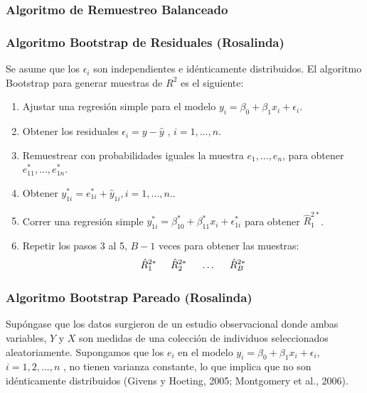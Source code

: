 \subsubsection{Algoritmo de Remuestreo Balanceado}



\subsubsection{Algoritmo Bootstrap de Residuales (Rosalinda)}

Se asume que los $ \epsilon_{i} $ son independientes e idénticamente distribuidos. El algoritmo Bootstrap para generar muestras de $ R^{2} $ es el siguiente:

\begin{enumerate}
		\item Ajustar una regresión simple para el modelo $ y_{i} = \beta_{0} +\beta_{1}x_{i} + \epsilon_{i} $.
		\item Obtener los residuales $ \epsilon_{i} = y - \hat{y}   $
		, $i = 1,..., n $.
		\item  Remuestrear con probabilidades iguales la muestra $ e_{1},...,e_{n} $, para obtener $e^{*}_{11},...,e^{*}_{1n}$.
		\item Obtener $ y^{*}_{1i} = e^{*}_{1i} + \hat{y}_{1i}, i = 1, ..., n. $.
		\item Correr una regresión simple $ y^{*}_{1i} = \beta^{*}_{10} +\beta^{*}_{11}x_{i} + \epsilon^{*}_{1i} $ para obtener $ \hat{R}^{2*}_{1} $.
		\item Repetir los pasos 3 al 5, $B - 1$ veces para obtener las muestras: 
		\[
		\hat{R}^{2*}_{1} \hspace{.5cm} \hat{R}^{2*}_{2} \hspace{.5cm} \dots \hspace{.5cm} \hat{R}^{2*}_{B}
		\]
\end{enumerate}


\subsubsection{Algoritmo Bootstrap Pareado (Rosalinda)}

Supóngase que los datos surgieron de un estudio observacional donde ambas variables, $Y$ y $X$ son medidas de una colección de individuos seleccionados aleatoriamente. Supongamos que los $e_{i}$ en el modelo
$ y_{i} = \beta_{0} +\beta_{1}x_{i} + \epsilon_{i}$,    $i=1,2,..., n$ , no tienen varianza constante, lo que implica que no son idénticamente distribuidos (Givens y Hoeting, 2005; Montgomery et al., 2006).

